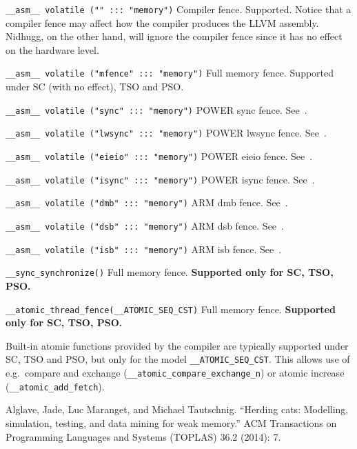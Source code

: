 \documentclass[a4paper]{article}
\newcommand{\limitsupport}[1]{\textbf{Supported only for #1.}}
\begin{document}
\begin{description}
\item{\texttt{\_\_asm\_\_ volatile ("" :::\ "memory")}} Compiler
  fence. Supported. Notice that a compiler fence may affect how the
  compiler produces the LLVM assembly. Nidhugg, on the other hand,
  will ignore the compiler fence since it has no effect on the
  hardware level.
\item{\texttt{\_\_asm\_\_ volatile ("mfence" :::\ "memory")}} Full
  memory fence. Supported under SC (with no effect), TSO and PSO.
\item{\texttt{\_\_asm\_\_ volatile ("sync" :::\ "memory")}} POWER \textsf{sync} fence. See~\cite{alglaveHerding}.
\item{\texttt{\_\_asm\_\_ volatile ("lwsync" :::\ "memory")}} POWER \textsf{lwsync} fence. See~\cite{alglaveHerding}.
\item{\texttt{\_\_asm\_\_ volatile ("eieio" :::\ "memory")}} POWER \textsf{eieio} fence. See~\cite{alglaveHerding}.
\item{\texttt{\_\_asm\_\_ volatile ("isync" :::\ "memory")}} POWER \textsf{isync} fence. See~\cite{alglaveHerding}.
\item{\texttt{\_\_asm\_\_ volatile ("dmb" :::\ "memory")}} ARM \textsf{dmb} fence. See~\cite{alglaveHerding}.
\item{\texttt{\_\_asm\_\_ volatile ("dsb" :::\ "memory")}} ARM \textsf{dsb} fence. See~\cite{alglaveHerding}.
\item{\texttt{\_\_asm\_\_ volatile ("isb" :::\ "memory")}} ARM \textsf{isb} fence. See~\cite{alglaveHerding}.
\item{\texttt{\_\_sync\_synchronize()}} Full memory fence. \limitsupport{SC, TSO, PSO}
\item{\texttt{\_\_atomic\_thread\_fence(\_\_ATOMIC\_SEQ\_CST)}} Full memory fence. \limitsupport{SC, TSO, PSO}
\end{description}

Built-in atomic functions provided by the compiler are typically
supported under SC, TSO and PSO, but only for the model
\texttt{\_\_ATOMIC\_SEQ\_CST}. This allows use of e.g.\ compare and
exchange (\texttt{\_\_atomic\_compare\_exchange\_n}) or atomic
increase (\texttt{\_\_atomic\_add\_fetch}).

\begin{thebibliography}{99}
  Alglave, Jade, Luc Maranget, and Michael Tautschnig. ``Herding cats: Modelling, simulation, testing, and data mining for weak memory.'' ACM Transactions on Programming Languages and Systems (TOPLAS) 36.2 (2014): 7.
\end{thebibliography}
\end{document}

